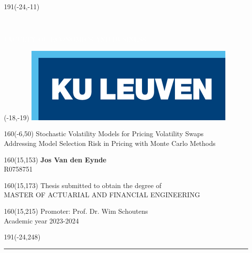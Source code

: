 \thispagestyle{empty}
\newcommand{\form}[1]{\scalebox{1.087}{\boldmath{#1}}}
\sffamily
%
\begin{textblock}{191}(-24,-11)
\colorbox{bluetitle}{\hspace{95mm}\ \parbox[c][18truemm]{94mm}{\textcolor{white}{FACULTY OF ECONOMICS AND BUSINESS}}}
\end{textblock}
%
\begin{textblock}{70}(-18,-19)
\textblockcolour{}
\includegraphics*[height=19.8truemm]{9 MainFormat/LogoKULeuven}
\end{textblock}
%
\begin{textblock}{160}(-6,50)
\textblockcolour{}
\vspace{-\parskip}
\flushleft
\fontsize{40}{42}\selectfont \textcolor{bluetitle}{Stochastic Volatility Models for Pricing Volatility Swaps}\\[1.5mm]
\fontsize{20}{22}\selectfont Addressing Model Selection Risk in Pricing with Monte Carlo Methods
\end{textblock}
%
\begin{textblock}{160}(15,153)
\textblockcolour{}
\vspace{-\parskip}
\flushright
\fontsize{14}{16}\selectfont \textbf{Jos Van den Eynde}\\[6pt]
\fontsize{8}{10}\selectfont R0758751
\end{textblock}
%
\begin{textblock}{160}(15,173)
\textblockcolour{}
\vspace{-\parskip}
\flushright
Thesis submitted to obtain the degree of\\[4.5pt]
MASTER OF ACTUARIAL AND FINANCIAL ENGINEERING\\[4.5pt]
\end{textblock}
%
\begin{textblock}{160}(15,215)
\textblockcolour{}
\vspace{-\parskip}
\flushright
Promoter: Prof. Dr. Wim Schoutens\\[4.5pt]
Academic year 2023-2024
\end{textblock}
%
\begin{textblock}{191}(-24,248)
{\color{blueline}\rule{550pt}{5.5pt}}
\end{textblock}
%
\vfill
\newpage

